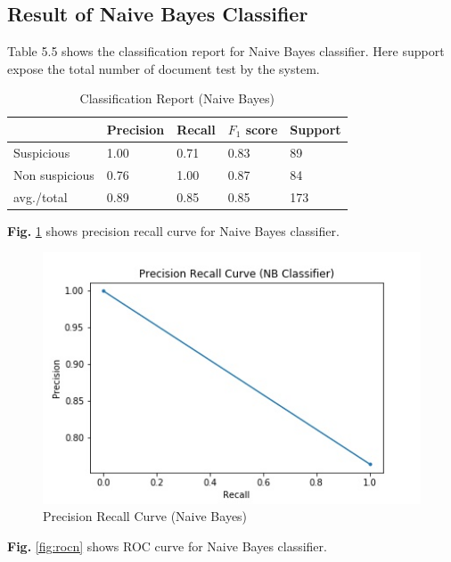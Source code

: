 \subsection{Result of Naive Bayes Classifier}
Table 5.5 shows the classification report for Naive Bayes classifier. Here support expose the total number of document test by the system.

\begin{table}[h!]
\begin{center}
\caption{Classification Report (Naive Bayes)}
\begin{tabular}{|m{4.4cm} | m{2cm}| m{2cm}| m{2cm}| m{2cm}|}
\hline
     & Precision & Recall & $F_1$ score & Support \\
\hline
     Suspicious & 1.00 & 0.71 & 0.83 & 89\\
\hline 
     Non suspicious  & 0.76 & 1.00 & 0.87 & 84\\
\hline 
     avg./total & 0.89 & 0.85 & 0.85 & 173\\
\hline
\end{tabular}
\end{center}
\end{table}

\noindent
\textbf{Fig.} \ref{fig:prn} shows precision recall curve for Naive Bayes classifier.

\begin{figure}[h!]
    \centering
    \includegraphics[scale=0.58]{Figures/PRN.jpg}
    \caption{Precision Recall Curve (Naive Bayes)}
    \label{fig:prn}
\end{figure}

\noindent
\textbf{Fig.} \ref{fig:rocn} shows ROC curve for Naive Bayes classifier.

